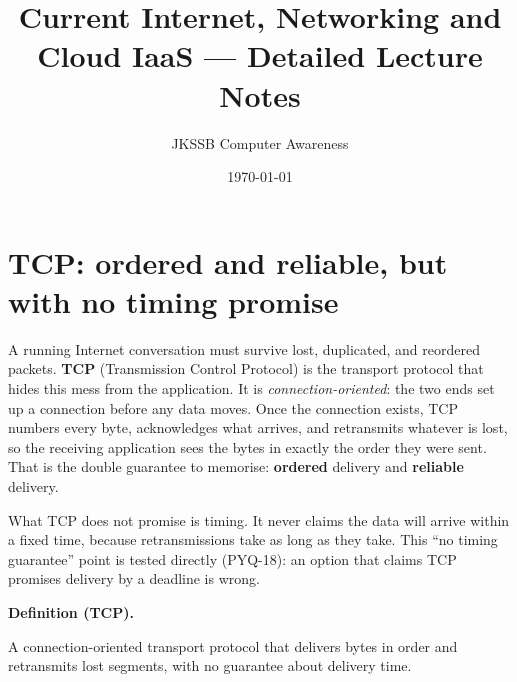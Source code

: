 \documentclass[11pt]{article}
\title{Current Internet, Networking and Cloud IaaS --- Detailed Lecture Notes}
\author{JKSSB Computer Awareness}
\date{\today}
\newenvironment{definitionbox}[1]{%
  \par\noindent\textbf{Definition (#1).}\ \itshape
}{\par\vspace{0.3em}}
\begin{document}
\maketitle

\section{TCP: ordered and reliable, but with no timing promise}
A running Internet conversation must survive lost, duplicated, and reordered
packets. \textbf{TCP} (Transmission Control Protocol) is the transport
protocol that hides this mess from the application. It is
\emph{connection-oriented}: the two ends set up a connection before any data
moves. Once the connection exists, TCP numbers every byte, acknowledges what
arrives, and retransmits whatever is lost, so the receiving application sees
the bytes in exactly the order they were sent. That is the double guarantee
to memorise: \textbf{ordered} delivery and \textbf{reliable} delivery.

What TCP does not promise is timing. It never claims the data will arrive
within a fixed time, because retransmissions take as long as they take. This
``no timing guarantee'' point is tested directly (PYQ-18): an option that
claims TCP promises delivery by a deadline is wrong.

\begin{definitionbox}{TCP}
A connection-oriented transport protocol that delivers bytes in order and
retransmits lost segments, with no guarantee about delivery time.
\end{definitionbox}
\end{document}
